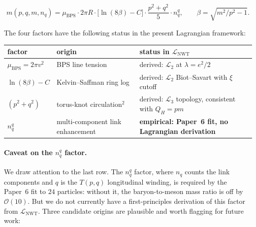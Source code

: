 \documentclass[11pt]{article}
\newcommand{\Lnwt}{\mathcal{L}_\text{NWT}}
\begin{document}
\begin{equation}
\label{eq:paper6}
  m(p, q, m, n_q)
   =  \mu_\text{BPS} \cdot 2 \pi R \cdot
      \bigl[\ln(8 \beta) - C\bigr] \cdot
      \frac{p^2 + q^2}{5} \cdot n_q^q ,
  \qquad
  \beta = \sqrt{m^2/p^2 - 1} .
\end{equation}

The four factors have the following status in the present
Lagrangian framework:

\begin{table}[H]
\centering
\renewcommand{\arraystretch}{1.2}
\begin{tabular}{lll}
\toprule
\textbf{factor} & \textbf{origin} & \textbf{status in $\Lnwt$} \\
\midrule
$\mu_\text{BPS} = 2 \pi v^2$ & BPS line tension &
derived: $\mathcal{L}_2$ at $\lambda = e^2/2$ \\
$\ln(8 \beta) - C$ & Kelvin--Saffman ring log &
derived: $\mathcal{L}_2$ Biot--Savart with $\xi$ cutoff \\
$(p^2 + q^2)$ & torus-knot circulation${}^2$ &
derived: $\mathcal{L}_3$ topology, consistent with $Q_H = pm$ \\
$n_q^q$ & multi-component link enhancement &
\textbf{empirical: Paper~6 fit, no Lagrangian derivation} \\
\bottomrule
\end{tabular}
\end{table}

\paragraph{Caveat on the $n_q^q$ factor.}
We draw attention to the last row.  The $n_q^q$ factor, where
$n_q$ counts the link components and $q$ is the $T(p, q)$
longitudinal winding, is required by the Paper~6 fit to $24$
particles: without it, the baryon-to-meson mass ratio is off by
$\mathcal{O}(10)$.  But we do not currently have a first-principles
derivation of this factor from $\Lnwt$.  Three candidate origins
are plausible and worth flagging for future work:
\end{document}
